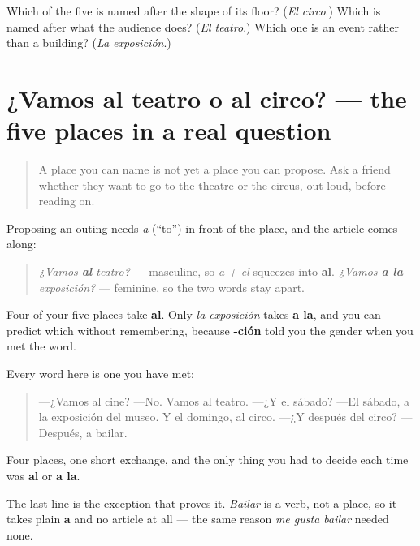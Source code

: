 \begin{tcolorbox}[breakable,colback=teal!4,colframe=teal!35!black,title={Before you move on}]
Which of the five is named after the shape of its floor? (\emph{El circo}.) Which is named after what the audience does? (\emph{El teatro}.) Which one is an event rather than a building? (\emph{La exposición}.)
\end{tcolorbox}
\section[¿Vamos al teatro o al circo?]{¿Vamos al teatro o al circo? — the five places in a real question}

\label{lesson:ES-C420-sintesis-salir}



\begin{quote}
A place you can name is not yet a place you can propose. Ask a friend whether they want to go to the theatre or the circus, out loud, before reading on.
\end{quote}

\begin{grammarlens}[title={Grammar Lens: al and a la, doing the gender work for you}]
Proposing an outing needs \emph{a} (\textquotedblleft{}to\textquotedblright{}) in front of the place, and the article comes along:

\begin{quote}
\emph{¿Vamos \textbf{al} teatro?} — masculine, so \emph{a + el} squeezes into \textbf{al}. \emph{¿Vamos \textbf{a la} exposición?} — feminine, so the two words stay apart.
\end{quote}

Four of your five places take \textbf{al}. Only \emph{la exposición} takes \textbf{a la}, and you can predict which without remembering, because \textbf{-ción} told you the gender when you met the word.
\end{grammarlens}

\begin{tcolorbox}[breakable,skin=enhanced,colback=orange!6,colframe=orange!45!black,boxrule=0.5pt,arc=1mm,left=6pt,right=6pt,top=4pt,bottom=4pt,fonttitle=\bfseries,title={Read this}]
Every word here is one you have met:

\begin{quote}
—¿Vamos al cine? —No. Vamos al teatro. —¿Y el sábado? —El sábado, a la exposición del museo. Y el domingo, al circo. —¿Y después del circo? —Después, a bailar.
\end{quote}

Four places, one short exchange, and the only thing you had to decide each time was \textbf{al} or \textbf{a la}.

The last line is the exception that proves it. \emph{Bailar} is a verb, not a place, so it takes plain \textbf{a} and no article at all — the same reason \emph{me gusta bailar} needed none.
\end{tcolorbox}

